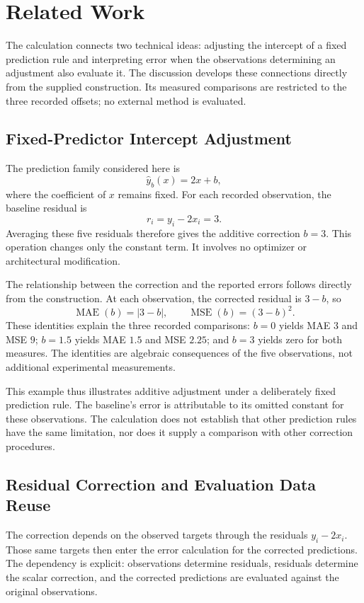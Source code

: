\documentclass[11pt]{article}
\begin{document}
\section{Related Work}
The calculation connects two technical ideas: adjusting the intercept of a fixed prediction rule and interpreting error when the observations determining an adjustment also evaluate it. The discussion develops these connections directly from the supplied construction. Its measured comparisons are restricted to the three recorded offsets; no external method is evaluated.

\subsection{Fixed-Predictor Intercept Adjustment}
The prediction family considered here is
\[
\widehat{y}_b(x)=2x+b,
\]
where the coefficient of \(x\) remains fixed. For each recorded observation, the baseline residual is
\[
r_i=y_i-2x_i=3.
\]
Averaging these five residuals therefore gives the additive correction \(b=3\). This operation changes only the constant term. It involves no optimizer or architectural modification.

The relationship between the correction and the reported errors follows directly from the construction. At each observation, the corrected residual is \(3-b\), so
\[
\operatorname{MAE}(b)=|3-b|,
\qquad
\operatorname{MSE}(b)=(3-b)^2.
\]
These identities explain the three recorded comparisons: \(b=0\) yields MAE \(3\) and MSE \(9\); \(b=1.5\) yields MAE \(1.5\) and MSE \(2.25\); and \(b=3\) yields zero for both measures. The identities are algebraic consequences of the five observations, not additional experimental measurements.

This example thus illustrates additive adjustment under a deliberately fixed prediction rule. The baseline's error is attributable to its omitted constant for these observations. The calculation does not establish that other prediction rules have the same limitation, nor does it supply a comparison with other correction procedures.

\subsection{Residual Correction and Evaluation Data Reuse}
The correction depends on the observed targets through the residuals \(y_i-2x_i\). Those same targets then enter the error calculation for the corrected predictions. The dependency is explicit: observations determine residuals, residuals determine the scalar correction, and the corrected predictions are evaluated against the original observations.
\end{document}
